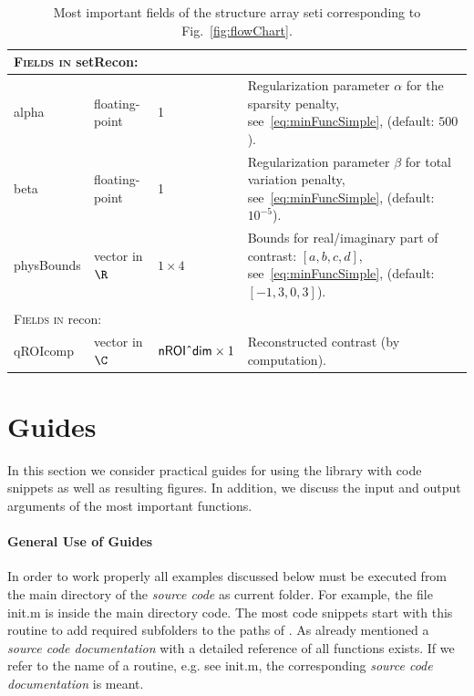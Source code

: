 \documentclass[a4paper]{article}
\begin{document}
\begin{table}
\begin{tabular}{p{1.8cm} p{2.1cm} p{3cm} p{7.9cm}}
\multicolumn{3}{l}{\textsc{Fields in} \textsf{setRecon}:}\\
\hline
\textsf{alpha} & floating-point & 1 & Regularization parameter $\alpha$ for the sparsity penalty, see~\eqref{eq:minFuncSimple}, (default: $500$).\\
\textsf{beta} & floating-point & 1 & Regularization parameter $\beta$ for total variation penalty, see~\eqref{eq:minFuncSimple}, (default: $10^{-5}$).\\
\textsf{physBounds} & vector in $\R$ & $1 \times 4$ & Bounds for real/imaginary part of contrast: $[a,b,c,d]$, see~\eqref{eq:minFuncSimple}, (default: $[-1,3,0,3]$).\\
\\

\multicolumn{3}{l}{\textsc{Fields in} \textsf{recon}:}\\
\hline
\textsf{qROIcomp} & vector in $\C$ & $\textsf{nROI}\textsf{\^{}}\textsf{dim} \times 1$ & Reconstructed contrast (by computation).\\

\end{tabular}
\caption{Most important fields of the structure array \textsf{seti} corresponding to Fig.~\ref{fig:flowChart}.}
\label{tab:impFields}
\end{table}


\section{Guides}\label{sec:guidelines}

In this section we consider practical guides for using the library with code snippets as well as resulting figures. In addition, we discuss the input and output arguments of the most important functions.

\paragraph{General Use of Guides} In order to work properly all examples discussed below must be executed from the main directory of the \emph{source code} as current folder. For example, the file \textsf{init.m} is inside the main directory \textsf{code}. The most code snippets start with this routine to add required subfolders to the paths of \MATLAB. 
As already mentioned a \emph{source code documentation} with a detailed reference of all functions exists. If we refer to the name of a routine, e.g. see \textsf{init.m}, the corresponding \emph{source code documentation} is meant.
\end{document}

